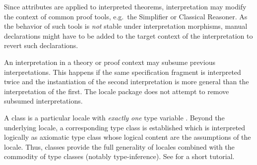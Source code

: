 \begin{isabellebody}
\begin{isamarkuptext}
\begin{description}
  \end{description}

  \begin{warn}
    Since attributes are applied to interpreted theorems,
    interpretation may modify the context of common proof tools, e.g.\
    the Simplifier or Classical Reasoner.  As the behavior of such
    tools is \emph{not} stable under interpretation morphisms, manual
    declarations might have to be added to the target context of the
    interpretation to revert such declarations.
  \end{warn}

  \begin{warn}
    An interpretation in a theory or proof context may subsume previous
    interpretations.  This happens if the same specification fragment
    is interpreted twice and the instantiation of the second
    interpretation is more general than the interpretation of the
    first.  The locale package does not attempt to remove subsumed
    interpretations.
  \end{warn}%
\end{isamarkuptext}%
\isamarkuptrue%
%
\isamarkuptrue%
%
\begin{isamarkuptext}%
A class is a particular locale with \emph{exactly one} type variable
  \isa{{\isaliteral{5C3C616C7068613E}{\isasymalpha}}}.  Beyond the underlying locale, a corresponding type class
  is established which is interpreted logically as axiomatic type
  class \cite{Wenzel:1997:TPHOL} whose logical content are the
  assumptions of the locale.  Thus, classes provide the full
  generality of locales combined with the commodity of type classes
  (notably type-inference).  See \cite{isabelle-classes} for a short
  tutorial.


\end{isamarkuptext}
\end{isabellebody}
